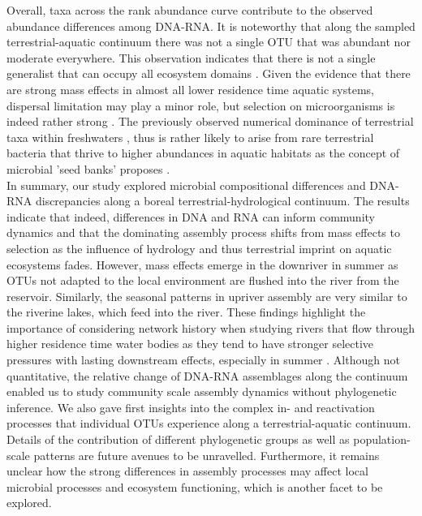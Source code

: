 \documentclass[12pt,a4paper]{article} %
\begin{document}
Overall, taxa across the rank abundance curve contribute to the observed abundance differences among DNA-RNA. It is noteworthy that  along the sampled terrestrial-aquatic continuum there was not a single OTU that was abundant nor moderate everywhere. This observation indicates that there is not a single generalist that can occupy all ecosystem domains \citep{Pandit2009}. Given the evidence that there are strong mass effects in almost all lower residence time aquatic systems, dispersal limitation may play a minor role, but selection on microorganisms is indeed rather strong \citep{Monard2016a}. The previously observed numerical dominance of terrestrial taxa within freshwaters \citep{Ruiz-Gonzalez2015}, thus is rather likely to arise from rare terrestrial bacteria that thrive to higher abundances in aquatic habitats as the concept of microbial 'seed banks' proposes \citep{Lennon2011}. \\[.3cm]

In summary, our study explored microbial compositional differences and DNA-RNA discrepancies along a boreal terrestrial-hydrological continuum. The results indicate that indeed, differences in DNA and RNA can inform community dynamics and that the dominating assembly process shifts from mass effects to selection as the influence of hydrology and thus terrestrial imprint on aquatic ecosystems fades. However, mass effects emerge in the downriver in summer as OTUs not adapted to the local environment are flushed into the river from the reservoir. Similarly, the seasonal patterns in upriver assembly are very similar to the riverine lakes, which feed into the river. These findings highlight the importance of considering network history when studying rivers that flow through higher residence time water bodies as they tend to have stronger selective pressures with lasting downstream effects, especially in summer \citep{Ward1983}. Although not quantitative, the relative change of DNA-RNA assemblages along the continuum enabled us to study community scale assembly dynamics without phylogenetic inference. We also gave first insights into the complex in- and reactivation processes that individual OTUs experience along a terrestrial-aquatic continuum. Details of the contribution of different phylogenetic groups as well as population-scale patterns are future avenues to be unravelled. Furthermore, it remains unclear how the strong differences in assembly processes may affect local microbial processes and ecosystem functioning, which is another facet to be explored.
\end{document}
